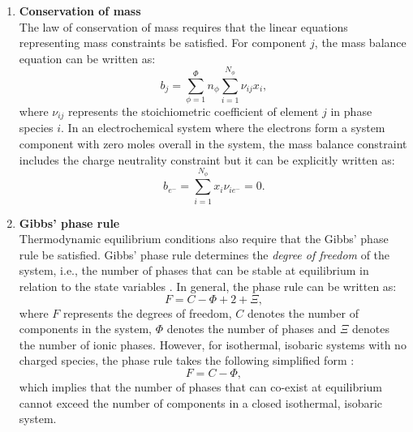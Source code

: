 	\begin{enumerate}
		\item \textbf{Conservation of mass}\\
			The law of conservation of mass requires that the linear equations representing mass constraints be satisfied. For component $j$, the mass balance equation can be written as:
			\begin{equation}\label{eq:massbalance}
				b_j = \sum_{\phi=1}^{\Phi} n_{\phi}\sum_{i=1}^{N_{\phi}} {\nu}_{ij} x_{i},
			\end{equation}
			where ${\nu}_{ij}$ represents the stoichiometric coefficient of element $j$ in phase species $i$. In an electrochemical system where the electrons form a system component with zero moles overall in the system, the mass balance constraint includes the charge neutrality constraint but it can be explicitly written as:
			\begin{equation}\label{eq:chargebalance}
				b_{e^-} = \sum_{i=1}^{N_{\phi}}x_{i}{\nu}_{i{e^-}} = 0.
			\end{equation} 
			
		\item \textbf{Gibbs' phase rule}\\
			Thermodynamic equilibrium conditions also require that the Gibbs' phase rule be satisfied. Gibbs' phase rule determines the \emph{degree of freedom} of the system, i.e., the number of phases that can be stable at equilibrium in relation to the state variables \cite{Gibbs:1878aa}. In general, the phase rule can be written as:
			\begin{equation}
                			F=C-\Phi + 2 + \Xi,
            		\end{equation}
            		where $F$ represents the degrees of freedom, $C$ denotes the number of components in the system, $\Phi$ denotes the number of phases and $\Xi$ denotes the number of ionic phases. However, for isothermal, isobaric systems with no charged species, the phase rule takes the following simplified form :
			\begin{equation}
                			F=C-\Phi,
            		\end{equation}
			which implies that the number of phases that can co-exist at equilibrium cannot exceed the number of components in a closed isothermal, isobaric system.
			

\end{enumerate}
